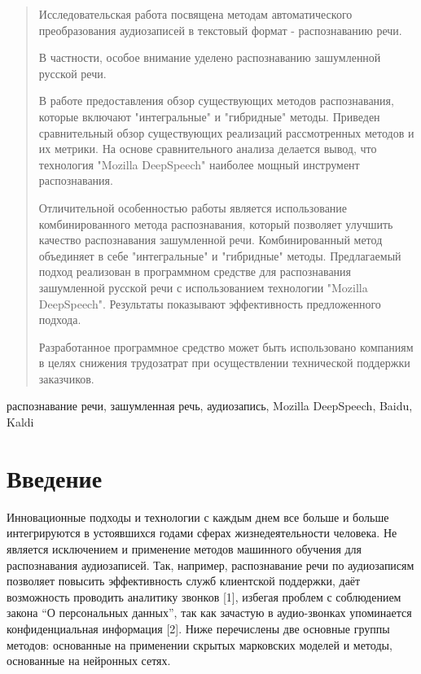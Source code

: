 \documentclass[conference]{IEEEtran}
\begin{document}
    \begin{abstract}
        Исследовательская работа посвящена методам автоматического преобразования аудиозаписей в текстовый формат - распознаванию речи.

        В частности, особое внимание уделено распознаванию зашумленной русской речи.

        В работе предоставления обзор существующих методов распознавания, которые включают "интегральные" и "гибридные" методы.
        Приведен сравнительный обзор существующих реализаций рассмотренных методов и их метрики.
        На основе сравнительного анализа делается вывод, что технология "Mozilla DeepSpeech" наиболее мощный инструмент распознавания.

        Отличительной особенностью работы является использование комбинированного метода распознавания, который позволяет улучшить качество распознавания зашумленной речи.
        Комбинированный метод объединяет в себе "интегральные" и "гибридные" методы.
        Предлагаемый подход реализован в программном средстве для распознавания зашумленной русской речи с использованием технологии "Mozilla DeepSpeech".
        Результаты показывают эффективность предложенного подхода.

        Разработанное программное средство может быть использовано компаниям в целях снижения трудозатрат при осуществлении технической поддержки заказчиков.
    \end{abstract}

    \begin{IEEEkeywords}
        распознавание речи, зашумленная речь, аудиозапись, Mozilla DeepSpeech, Baidu, Kaldi
    \end{IEEEkeywords}


    \section{Введение}

    Инновационные подходы и технологии с каждым днем все больше и больше интегрируются в устоявшихся годами сферах жизнедеятельности человека.
    Не является исключением и применение методов машинного обучения для распознавания аудиозаписей.
    Так, например, распознавание речи по аудиозаписям позволяет повысить эффективность служб клиентской поддержки, даёт возможность проводить аналитику звонков [1],
    избегая проблем с соблюдением закона “О персональных данных”, так как зачастую в аудио-звонках упоминается конфиденциальная информация [2].
    Ниже перечислены две основные группы методов: основанные на применении скрытых марковских моделей и методы, основанные на нейронных сетях.
\end{document}
